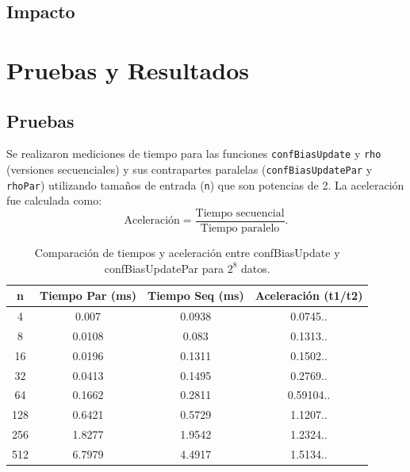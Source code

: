 \documentclass{article}
\begin{document}
    \subsection{Impacto}

\section{Pruebas y Resultados}

  \subsection{Pruebas}
  Se realizaron mediciones de tiempo para las funciones \texttt{confBiasUpdate} y \texttt{rho} (versiones secuenciales) y sus contrapartes paralelas (\texttt{confBiasUpdatePar} y \texttt{rhoPar}) utilizando tamaños de entrada (\texttt{n}) que son potencias de 2. La aceleración fue calculada como:
  \[
  \text{Aceleración} = \frac{\text{Tiempo secuencial}}{\text{Tiempo paralelo}}.
  \]
  \begin{table}[H]
  \centering
  \begin{tabular}{@{}cccc@{}}
  \toprule
  \textbf{n} & \textbf{Tiempo Par (ms)} & \textbf{Tiempo Seq (ms)} & \textbf{Aceleración (t1/t2)} \\ \midrule
  4 & 0.007 & 0.0938 & 0.0745.. \\
  8 & 0.0108 & 0.083 & 0.1313.. \\
  16 & 0.0196 & 0.1311 & 0.1502.. \\
  32 & 0.0413 & 0.1495 & 0.2769.. \\
  64 & 0.1662 & 0.2811 & 0.59104.. \\
  128 & 0.6421 & 0.5729 & 1.1207.. \\
  256 & 1.8277 & 1.9542 & 1.2324.. \\
  512 & 6.7979 & 4.4917 & 1.5134.. \\

  \bottomrule
  \end{tabular}
  \caption{Comparación de tiempos y aceleración entre confBiasUpdate y confBiasUpdatePar para $2^8$ datos.}
  \label{tab:comparison}
  \end{table}
\end{document}
